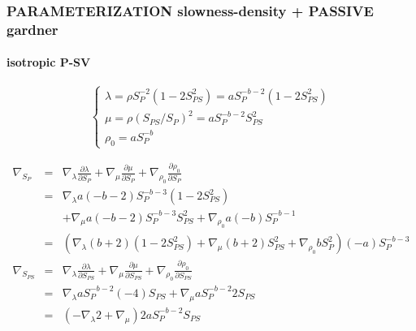 \documentclass[9pt]{beamer}
\newcommand{\partderi}[2]{\frac{\partial#1}{\partial#2}}
\begin{document}
\begin{frame}\frametitle{PARAMETERIZATION slowness-density  + PASSIVE gardner}
\framesubtitle{isotropic P-SV}

  \begin{center}
  \end{center}
  
  \[\left\{ \begin{array}{l}
    \lambda = \rho S_P^{-2} (1-2S_{PS}^2) = a S_P^{-b-2} (1-2S_{PS}^2) \\
    \mu    = \rho (S_{PS}/S_P)^2 = a S_P^{-b-2} S_{PS}^2\\
    \rho_0 = a S_P^{-b}
  \end{array} \right.\]
  
  \begin{eqnarray}
    \nabla_{S_P} &=& \nabla_\lambda \partderi{\lambda}{S_P} + \nabla_\mu \partderi{\mu}{S_P} + \nabla_{\rho_0} \partderi{\rho_0}{S_P} \nonumber\\
		 &=& \nabla_\lambda a(-b-2)S_P^{-b-3}(1-2S_{PS}^2) \nonumber\\
		 & &+\nabla_\mu a(-b-2) S_P^{-b-3}S_{PS}^2 + \nabla_{\rho_0} a(-b)S_P^{-b-1} \nonumber\\
		 &=& \left(\nabla_\lambda (b+2)(1-2S_{PS}^2) + \nabla_\mu (b+2)S_{PS}^2 + \nabla_{\rho_0} bS_P^2 \right) (-a) S_P^{-b-3} \nonumber\\
    \nabla_{S_{PS}} &=& \nabla_\lambda \partderi{\lambda}{S_{PS}} + \nabla_\mu \partderi{\mu}{S_{PS}} + \nabla_{\rho_0} \partderi{\rho_0}{S_{PS}} \nonumber\\
		    &=& \nabla_\lambda a S_P^{-b-2} (-4)S_{PS} + \nabla_\mu a S_P^{-b-2} 2S_{PS} \nonumber\\
		    &=& \left(-\nabla_\lambda 2 + \nabla_\mu \right) 2aS_P^{-b-2}S_{PS}\nonumber\\
  \end{eqnarray}

\end{frame}
\end{document}
